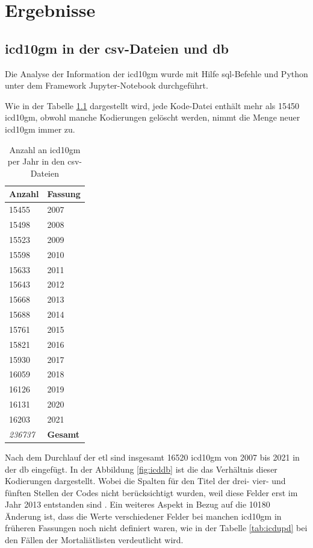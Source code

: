 \chapter{Ergebnisse}

\section{\acs{icd10gm} in der \acs{csv}-Dateien und \acs{db}} \label{dataanalysis}
Die Analyse der Information der \ac{icd10gm} wurde mit Hilfe \ac{sql}-Befehle und Python unter dem Framework Jupyter-Notebook durchgeführt.

Wie in der Tabelle \ref{tab:icdfiles} dargestellt wird, jede Kode-Datei enthält mehr als \textsf{15450} \ac{icd10gm}, obwohl manche Kodierungen gelöscht werden, nimmt die Menge neuer \ac{icd10gm} immer zu.

\begin{table}[ht]
	\centering
	\small
	\caption[\acs{icd10gm} in den \acs{csv}-Dateien]{Anzahl an \acs{icd10gm} per Jahr in den \ac{csv}-Dateien}
	\label{tab:icdfiles}
	\begin{tabular}{|l|l|}
		\hline
	\rowcolor{lightgray} Anzahl & Fassung \\ \hline 
		15455 & 2007 \\ \hline
		15498 & 2008 \\ \hline
		15523 & 2009 \\ \hline
		15598 & 2010 \\ \hline
		15633 & 2011 \\ \hline
		15643 & 2012 \\ \hline
		15668 & 2013 \\ \hline
		15688 & 2014 \\ \hline
		15761 & 2015 \\ \hline
		15821 & 2016 \\ \hline
		15930 & 2017 \\ \hline
		16059 & 2018 \\ \hline
		16126 & 2019 \\ \hline
		16131 & 2020 \\ \hline
		16203 & 2021 \\ \hline
		\hline
		\textit{236737} & \textbf{Gesamt} \\ \hline
	\end{tabular}
	\end{table}

Nach dem Durchlauf der \ac{etl} sind insgesamt \textsf{16520} \ac{icd10gm} von 2007 bis 2021 in der \ac{db} eingefügt. In der Abbildung \ref{fig:icddb} ist die das Verhältnis dieser Kodierungen dargestellt. Wobei die Spalten für den Titel der drei- vier- und fünften Stellen der Codes nicht berücksichtigt wurden, weil diese Felder erst im Jahr 2013 entstanden sind \cite{readme13}. Ein weiteres Aspekt in Bezug auf die \textsf{10180} Änderung ist, dass die Werte verschiedener Felder  bei manchen \ac{icd10gm} in früheren Fassungen noch nicht definiert waren, wie in der Tabelle \ref{tab:icdupd} bei den Fällen der Mortaliätlisten verdeutlicht wird.

